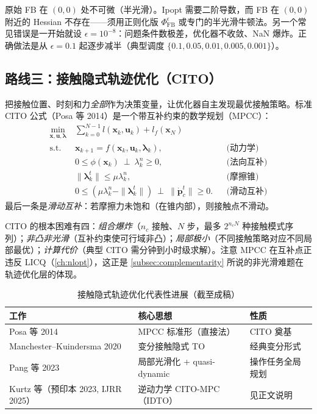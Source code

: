 \begin{pitfall}
原始 FB 在 $(0,0)$ 处不可微（半光滑）。Ipopt 需要二阶导数，而 FB 在 $(0,0)$ 附近的 Hessian 不存在——须用正则化版 $\Phi_{\mathrm{FB}}^{\epsilon}$ 或专门的半光滑牛顿法。另一个常见错误是一开始就设 $\epsilon=10^{-8}$：问题条件数极差，优化器不收敛、NaN 爆炸。正确做法是从 $\epsilon=0.1$ 起逐步减半（典型调度 $\{0.1,0.05,0.01,0.005,0.001\}$）。
\end{pitfall}

\subsection{路线三：接触隐式轨迹优化（CITO）}
\label{subsec:route-cito}

把接触位置、时刻和力\emph{全部}作为决策变量，让优化器自主发现最优接触策略。标准 CITO 公式（Posa 等 2014\cite{posa2014direct}）是一个带互补约束的数学规划（MPCC）：
\begin{equation}
  \begin{aligned}
  \min_{\boldsymbol{x},\boldsymbol{u},\boldsymbol{\lambda}}\ & \sum_{k=0}^{N-1} l(\boldsymbol{x}_k,\boldsymbol{u}_k)+l_f(\boldsymbol{x}_N)\\
  \text{s.t.}\ & \boldsymbol{x}_{k+1}=f(\boldsymbol{x}_k,\boldsymbol{u}_k,\boldsymbol{\lambda}_k), && \text{(动力学)}\\
  & 0\le\phi(\boldsymbol{x}_k)\ \perp\ \lambda_k^n\ge0, && \text{(法向互补)}\\
  & \|\boldsymbol{\lambda}_k^t\|\le\mu\lambda_k^n, && \text{(摩擦锥)}\\
  & 0\le(\mu\lambda_k^n-\|\boldsymbol{\lambda}_k^t\|)\ \perp\ \|\dot{\boldsymbol{p}}_c^t\|\ge0. && \text{(滑动互补)}
  \end{aligned}
  \label{eq:cito}
\end{equation}
最后一条是\emph{滑动互补}：若摩擦力未饱和（在锥内部），则接触点不滑动。

CITO 的根本困难有四：\emph{组合爆炸}（$n_c$ 接触、$N$ 步，最多 $2^{n_c N}$ 种接触模式序列）；\emph{非凸非光滑}（互补约束使可行域非凸）；\emph{局部极小}（不同接触策略对应不同局部最优）；\emph{计算代价}（典型 CITO 需分钟到小时级求解）。注意 MPCC 在互补点正违反 LICQ（\cref{ch:nlopt}），这正是 \cref{subsec:complementarity} 所说的非光滑难题在轨迹优化层的体现。

\begin{table}[H]\centering\small
\caption{接触隐式轨迹优化代表性进展（截至成稿）}
\label{tab:cito-progress}
\begin{tabular}{lll}
\toprule
工作 & 核心思想 & 性质 \\
\midrule
Posa 等 2014\cite{posa2014direct} & MPCC 标准形（直接法）& CITO 奠基 \\
Manchester--Kuindersma 2020\cite{manchester2020variational} & 变分接触隐式 TO & 经典变分形式 \\
Pang 等 2023\cite{pang2023global} & 局部光滑化 + quasi-dynamic & 操作任务全局规划 \\
Kurtz 等（预印本 2023, IJRR 2025）\cite{kurtz2025inverse} & 逆动力学 CITO-MPC（IDTO）& 见正文说明 \\
\bottomrule
\end{tabular}
\end{table}

